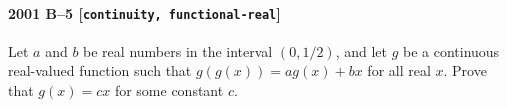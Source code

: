 \paragraph{2001 B--5 \textnormal{[\texttt{continuity, functional-real}]}}
Let $a$ and $b$ be real numbers in the interval $(0,1/2)$, and
let $g$ be a continuous real-valued function such that
$g(g(x))= ag(x)+bx$ for all real $x$. Prove that
$g(x)=cx$ for some constant $c$.
